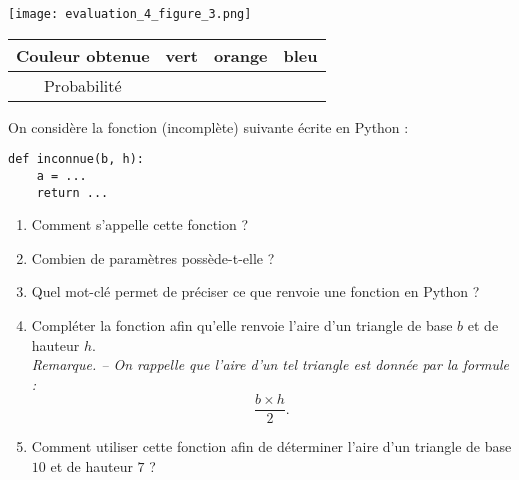 \documentclass[a4paper,dvipsnames]{article}
\begin{document}
\begin{multicols}{2}
  \begin{center}
    \texttt{[image: evaluation\_4\_figure\_3.png]}
  \end{center}

  \begin{center}
    \vspace*{0.75cm}
    \hspace*{-3cm}\begin{tabular}{@{}cccc@{}}
      \toprule
      Couleur obtenue & vert & orange & bleu\\
      \midrule
      Probabilité & & & \vphantom{$\dfrac{1}{4}$}\\
      \bottomrule
    \end{tabular}
  \end{center}
\end{multicols}

\bigskip

\exo On considère la fonction (incomplète) suivante écrite en Python :

\begin{verbatim}
def inconnue(b, h):
    a = ...
    return ...
\end{verbatim}

\begin{enumerate}
  \item Comment s'appelle cette fonction ?
  \item Combien de paramètres possède-t-elle ?
  \item Quel mot-clé permet de préciser ce que renvoie une fonction en Python ?
  \item Compléter la fonction afin qu'elle renvoie l'aire d'un triangle de base $b$ et de hauteur $h$.\\
    \textit{Remarque. -- On rappelle que l'aire d'un tel triangle est donnée par la formule :
      \[\dfrac{b\times h}{2}.\]
  }
\item Comment utiliser cette fonction afin de déterminer l'aire d'un triangle de base $10$ et de hauteur $7$ ?
\end{enumerate}
\end{document}

